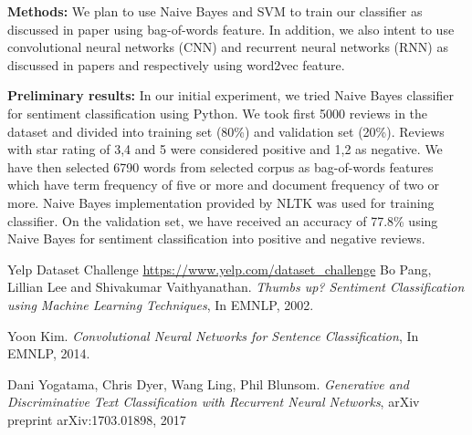 \documentclass[11pt]{article}
\begin{document}
	\noindent\textbf{Methods:}
	We plan to use Naive Bayes and SVM to train our classifier as discussed in paper \cite{plv} using bag-of-words feature. In addition, we also intent to use convolutional neural networks (CNN) and recurrent neural networks (RNN) as discussed in papers \cite{kim} and \cite{ydlb} respectively using word2vec feature.
	\bigskip
	
	\noindent\textbf{Preliminary results:}
	In our initial experiment, we tried Naive Bayes classifier for sentiment classification using Python. We took first 5000 reviews in the dataset and divided into training set (80\%) and validation set (20\%). Reviews with star rating of 3,4 and 5 were considered positive and 1,2 as negative. We have then selected 6790 words from selected corpus as bag-of-words features which have term frequency of five or more and document frequency of two or more. Naive Bayes implementation provided by NLTK was used for training classifier. On the validation set, we have received an accuracy of 77.8\% using Naive Bayes for sentiment classification into positive and negative reviews.
	\bigskip
	
	\begin{thebibliography}{9}
		
		 Yelp Dataset Challenge \url{https://www.yelp.com/dataset_challenge}
		 Bo Pang, Lillian Lee and Shivakumar Vaithyanathan. \textit{Thumbs up? Sentiment Classification using Machine Learning
			Techniques}, In EMNLP, 2002.   
		
		 Yoon Kim. \textit{Convolutional Neural Networks for Sentence Classification}, In EMNLP, 2014.
		
		 Dani Yogatama, Chris Dyer, Wang Ling, Phil Blunsom. \textit{Generative and Discriminative Text Classification
			with Recurrent Neural Networks}, arXiv preprint arXiv:1703.01898, 2017
		
	\end{thebibliography}
	
	
	
	
	
	
	
\end{document}
